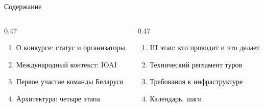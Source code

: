 \begin{frame}{Содержание}
  \vspace{0.4em}
  \begin{columns}[T]
    \begin{column}{0.47\textwidth}
      \begin{enumerate}\setlength\itemsep{0.55em}
        \item О конкурсе: статус и организаторы
        \item Международный контекст: IOAI
        \item Первое участие команды Беларуси
        \item Архитектура: четыре этапа
      \end{enumerate}
    \end{column}
    \begin{column}{0.47\textwidth}
      \begin{enumerate}\setlength\itemsep{0.55em}\setcounter{enumi}{4}
        \item III этап: кто проводит и что делает
        \item Технический регламент туров
        \item Требования к инфраструктуре
        \item Календарь, шаги
      \end{enumerate}
    \end{column}
  \end{columns}
\end{frame}
